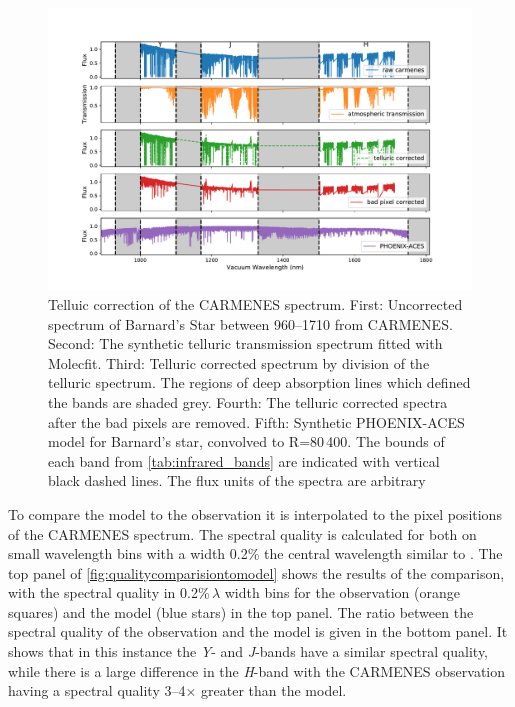 \begin{figure}
    \centering
    \includegraphics[width=0.9\linewidth]{figures/information-content/Carmenes/bp_carmenes_masked_model_broadened}
    \caption[Telluic correction of the {CARMENES} \nir{} spectrum.]{Telluic correction of the {CARMENES} \nir{} spectrum.
        First: Uncorrected spectrum of Barnard's Star between 960--1710\nm{} from {CARMENES}.
        Second: The synthetic telluric transmission spectrum fitted with {Molecfit}.
        Third: Telluric corrected spectrum by division of the telluric spectrum.
        The regions of deep  absorption lines which defined the \nir{} bands are shaded grey.
        Fourth: The telluric corrected spectra after the bad pixels are removed.
        Fifth: Synthetic PHOENIX-ACES model for Barnard's star, convolved to R=80\,400.
        The bounds of each band from \cref{tab:infrared_bands} are indicated with vertical black dashed lines.
        The flux units of the spectra are arbitrary}
    \label{fig:carmenes_correction}
\end{figure}


To compare the model to the observation it is interpolated to the pixel positions of the {CARMENES} spectrum.
The spectral quality is calculated for both on small wavelength bins with a width 0.2\% the central wavelength similar to \citep{artigau_optical_2018}.
The top panel of \cref{fig:qualitycomparisiontomodel} shows the results of the comparison, with the spectral quality in 0.2\%\,\(\lambda\) width bins for the observation (orange squares) and the model (blue stars) in the top panel.
The ratio between the spectral quality of the observation and the model is given in the bottom panel.
It shows that in this instance the \emph{Y}- and \emph{J}-bands have a similar spectral quality, while there is a large difference in the \emph{H}-band with the CARMENES observation having a spectral quality 3--4\(\times\) greater than the model.

